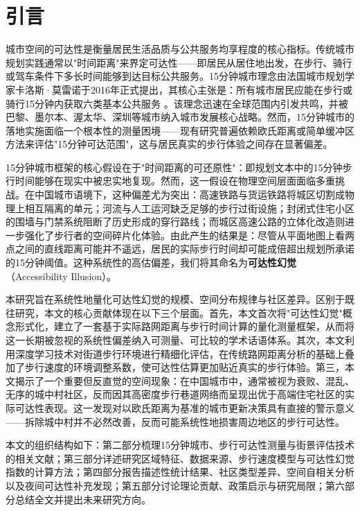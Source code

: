 \documentclass[10pt,conference]{IEEEtran}
\begin{document}
\IEEEpeerreviewmaketitle

\section{引言}
\label{sec:introduction}

城市空间的可达性是衡量居民生活品质与公共服务均享程度的核心指标。传统城市规划实践通常以"时间距离"来界定可达性——即居民从居住地出发，在步行、骑行或驾车条件下多长时间能够到达目标公共服务。15分钟城市理念由法国城市规划学家卡洛斯·莫雷诺于2016年正式提出，其核心主张是：所有城市居民应能在步行或骑行15分钟内获取六类基本公共服务 \cite{moreno202115minute}。该理念迅速在全球范围内引发共鸣，并被巴黎、墨尔本、渥太华、深圳等城市纳入城市发展核心战略。然而，15分钟城市的落地实施面临一个根本性的测量困境——现有研究普遍依赖欧氏距离或简单缓冲区方法来评估"15分钟可达范围"，这与居民真实的步行体验之间存在显著偏差。

15分钟城市框架的核心假设在于"时间距离的可还原性"：即规划文本中的15分钟步行时间能够在现实中被忠实地复现。然而，这一假设在物理空间层面面临多重挑战。在中国城市语境下，这种偏差尤为突出：高速铁路与货运铁路将城区切割成物理上相互隔离的单元；河流与人工运河缺乏足够的步行过街设施；封闭式住宅小区的围墙与门禁系统阻断了历史形成的穿行路线；而城区高速公路的立体化改造则进一步强化了步行者的空间碎片化体验。由此产生的结果是：尽管从平面地图上看两点之间的直线距离可能并不遥远，居民的实际步行时间却可能成倍超出规划所承诺的15分钟阈值。这种系统性的高估偏差，我们将其命名为\textbf{可达性幻觉}（Accessibility Illusion）。

本研究旨在系统性地量化可达性幻觉的规模、空间分布规律与社区差异。区别于既往研究，本文的核心贡献体现在以下三个层面。首先，本文首次将"可达性幻觉"概念形式化，建立了一套基于实际路网距离与步行时间计算的量化测量框架，从而将这一长期被忽视的系统性偏差纳入可测量、可比较的学术话语体系。其次，本文利用深度学习技术对街道步行环境进行精细化评估，在传统路网距离分析的基础上叠加了步行速度的环境调整系数，使可达性估算更加贴近真实的步行体验。第三，本文揭示了一个重要但反直觉的空间现象：在中国城市中，通常被视为衰败、混乱、无序的城中村社区，反而因其高密度步行巷道网络而呈现出优于高端住宅社区的实际可达性表现。这一发现对以欧氏距离为基准的城市更新决策具有直接的警示意义——拆除城中村并不必然改善，反而可能系统性地损害周边地区的步行可达性。

本文的组织结构如下：第二部分梳理15分钟城市、步行可达性测量与街景评估技术的相关文献；第三部分详述研究区域特征、数据来源、步行速度模型与可达性幻觉指数的计算方法；第四部分报告描述性统计结果、社区类型差异、空间自相关分析以及夜间可达性补充发现；第五部分讨论理论贡献、政策启示与研究局限；第六部分总结全文并提出未来研究方向。
\end{document}
